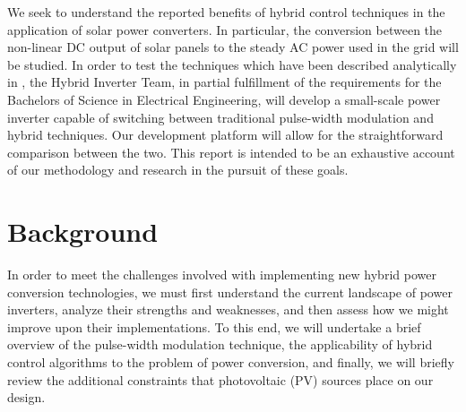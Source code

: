 We seek to understand the reported benefits of hybrid control techniques in the application of solar power converters. In particular, the conversion between the non-linear DC output of solar panels to the steady AC power used in the grid will be studied. In order to test the techniques which have been described analytically in \cite{ricardo}, the Hybrid Inverter Team, in partial fulfillment of the requirements for the Bachelors of Science in Electrical Engineering, will develop a small-scale power inverter capable of switching between traditional pulse-width modulation and hybrid techniques. Our development platform will allow for the straightforward comparison between the two. This report is intended to be an exhaustive account of our methodology and research in the pursuit of these goals.

\section{Background}
In order to meet the challenges involved with implementing new hybrid power conversion technologies, we must first understand the current landscape of power inverters, analyze their strengths and weaknesses, and then assess how we might improve upon their implementations. To this end, we will undertake a brief overview of the pulse-width modulation technique, the applicability of hybrid control algorithms to the problem of power conversion, and finally, we will briefly review the additional constraints that photovoltaic (PV) sources place on our design. 

